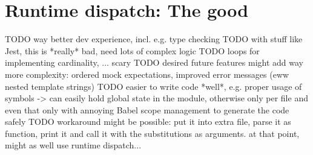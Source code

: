 \section{Runtime dispatch: The good}
TODO way better dev experience, incl. e.g. type checking
TODO   with stuff like Jest, this is *really* bad, need lots of complex logic
TODO   loops for implementing cardinality, ... scary
TODO   desired future features might add way more complexity: ordered mock expectations, improved error messages (eww nested template strings)
TODO   easier to write code *well*, e.g. proper usage of symbols -> can easily hold global state in the module, otherwise only per file and even that only with annoying Babel scope management to generate the code safely
TODO   workaround might be possible: put it into extra file, parse it as function, print it and call it with the substitutions as arguments. at that point, might as well use runtime dispatch...
